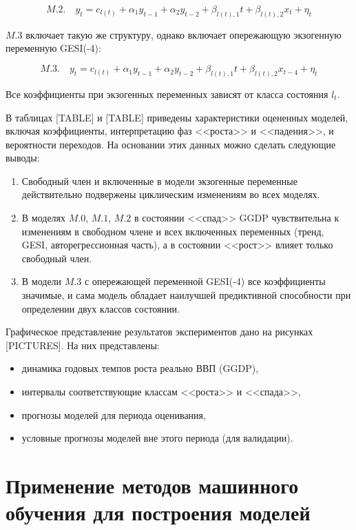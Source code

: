 \documentclass[a4paper,14pt]{extreport}
\begin{document}
\[
	M.2. \quad y_t = c_{l(t)} + \alpha_1 y_{t-1} + \alpha_2 y_{t-2} + \beta_{l(t), 1} t + \beta_{l(t), 2} x_{t} + \eta_t
\]

$M.3$ включает такую же структуру, однако включает опережающую экзогенную переменную GESI(-4):

\[
	M.3. \quad y_t = c_{l(t)} + \alpha_1 y_{t-1} + \alpha_2 y_{t-2} + \beta_{l(t), 1} t + \beta_{l(t), 2} x_{t-4} + \eta_t
\]

Все коэффициенты при экзогенных переменных зависят от класса состояния $l_t$.

В таблицах [TABLE] и [TABLE] приведены характеристики оцененных моделей, включая коэффициенты, интерпретацию фаз <<роста>> и <<падения>>, и вероятности переходов. На основании этих данных можно сделать следующие выводы:

\begin{enumerate}
	\item Свободный член и включенные в модели экзогенные переменные действительно подвержены циклическим изменениям во всех моделях.
	\item В моделях $M.0$, $M.1$, $M.2$ в состоянии <<спад>> GGDP чувствительна к изменениям в свободном члене и всех включенных переменных (тренд, GESI, авторегрессионная часть), а в состоянии <<рост>> влияет только свободный член.
	\item В модели $M.3$ с опережающей переменной GESI(-4) все коэффициенты значимые, и сама модель обладает наилучшей предиктивной способности при определении двух классов состоянии.
\end{enumerate}


Графическое представление результатов экспериментов дано на рисунках [PICTURES]. На них представлены:

\begin{itemize}
	\item динамика годовых темпов роста реально ВВП (GGDP),
	\item интервалы соответствующие классам <<роста>> и <<спада>>,
	\item прогнозы моделей для периода оценивания,
	\item условные прогнозы моделей вне этого периода (для валидации).
\end{itemize}



\chapter{Применение методов машинного обучения для построения моделей}
\end{document}
